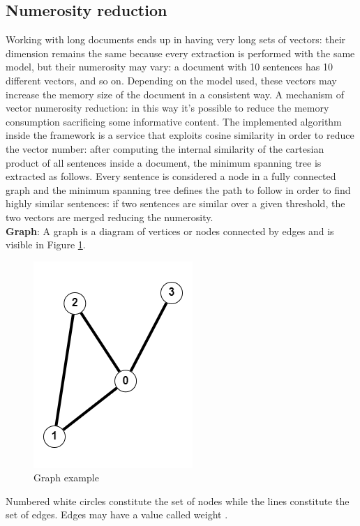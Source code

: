 \documentclass[\main/main.tex]{subfiles}
\begin{document}
\subsection{Numerosity reduction} 
Working with long documents ends up in having very long sets of vectors: their dimension remains the same because every extraction is performed with the same model, but their numerosity may vary: a document with 10 sentences has 10 different vectors, and so on. Depending on the model used, these vectors may increase the memory size of the document in a consistent way. A mechanism of vector numerosity reduction: in this way it's possible to reduce the memory consumption sacrificing some informative content. The implemented algorithm inside the framework is a service that exploits cosine similarity in order to reduce the vector number: after computing the internal similarity of the cartesian product of all sentences inside a document, the minimum spanning tree is extracted as follows. Every sentence is considered a node in a fully connected graph and the minimum spanning tree defines the path to follow in order to find highly similar sentences: if two sentences are similar over a given threshold, the two vectors are merged reducing the numerosity. \\
\textbf{Graph}:
A graph is a diagram of vertices or nodes connected by edges and is visible in Figure \ref{fig:graph_example}.
\begin{center}
    \begin{figure}[H]
    \centering
    \includegraphics[scale=1]{images/methods/graph_example.png}
    \caption{Graph example}
    \label{fig:graph_example}
\end{figure}
\end{center}
Numbered white circles constitute the set of nodes while the lines constitute the set of edges. Edges may have a value called weight \cite{Siu1998IntroductionTG}. \\
\end{document}
